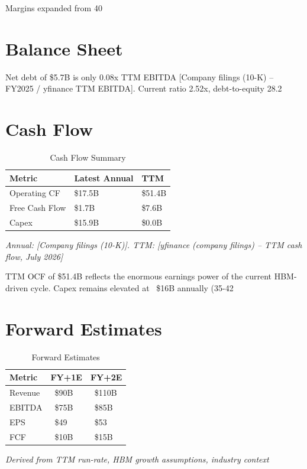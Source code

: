 \documentclass[11pt,a4paper]{report}
\newcommand{\source}[1]{\hfill\small\textit{#1}}
\begin{document}
Margins expanded from 40%

\section{Balance Sheet}
Net debt of \$5.7B is only 0.08x TTM EBITDA [Company filings (10-K) -- FY2025 / yfinance TTM EBITDA]. Current ratio 2.52x, debt-to-equity 28.2%

\section{Cash Flow}
\begin{table}[H]
\centering
\caption{Cash Flow Summary}
\begin{tabularx}{\textwidth}{lC{2.5cm}C{2.5cm}}
\toprule
\textbf{Metric} & \textbf{Latest Annual} & \textbf{TTM} \\
\midrule
Operating CF & \$17.5B & \$51.4B \\
Free Cash Flow & \$1.7B & \$7.6B \\
Capex & \$15.9B & \$0.0B
\bottomrule
\end{tabularx}
\source{Annual: [Company filings (10-K)]. TTM: [yfinance (company filings) -- TTM cash flow, July 2026]}
\end{table}

TTM OCF of \$51.4B reflects the enormous earnings power of the current HBM-driven cycle. Capex remains elevated at ~\$16B annually (35-42%

\section{Forward Estimates}
\begin{table}[H]
\centering
\caption{Forward Estimates}
\begin{tabularx}{\textwidth}{lC{2.5cm}C{2.5cm}}
\toprule
\textbf{Metric} & \textbf{FY+1E} & \textbf{FY+2E} \\
\midrule
Revenue & ~\$90B & ~\$110B \\
EBITDA & ~\$75B & ~\$85B \\
EPS & ~\$49 & ~\$53 \\
FCF & ~\$10B & ~\$15B
\bottomrule
\end{tabularx}
\source{Derived from TTM run-rate, HBM growth assumptions, industry context}
\end{table}
\end{document}
